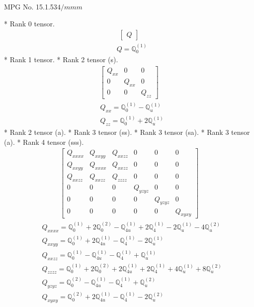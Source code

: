 \documentclass[fleqn,8pt,landscape]{jsarticle}
\begin{document}
\setcounter{MaxMatrixCols}{32}

\renewcommand{\tablename}{Table~}
\renewcommand{\figurename}{Figure~}
\begin{center}
\LARGE
MPG No. 15.1.53\quad$4/mmm$
\end{center}
* Rank 0 tensor.
\begin{align*}
\begin{bmatrix} Q \end{bmatrix}
\end{align*}
\begin{align*}
& Q = \mathbb{Q}_{0}^{(1)}
\end{align*}
* Rank 1 tensor.
* Rank 2 tensor (s).
\begin{align*}
\begin{bmatrix} Q_{xx} & 0 & 0 \\ 0 & Q_{xx} & 0 \\ 0 & 0 & Q_{zz} \end{bmatrix}
\end{align*}
\begin{align*}
& Q_{xx} = \mathbb{Q}_{0}^{(1)} - \mathbb{Q}_{u}^{(1)} \\
& Q_{zz} = \mathbb{Q}_{0}^{(1)} + 2 \mathbb{Q}_{u}^{(1)}
\end{align*}
* Rank 2 tensor (a).
* Rank 3 tensor (ss).
* Rank 3 tensor (sa).
* Rank 3 tensor (a).
* Rank 4 tensor (sss).
\begin{align*}
\begin{bmatrix} Q_{xxxx} & Q_{xxyy} & Q_{xxzz} & 0 & 0 & 0 \\ Q_{xxyy} & Q_{xxxx} & Q_{xxzz} & 0 & 0 & 0 \\ Q_{xxzz} & Q_{xxzz} & Q_{zzzz} & 0 & 0 & 0 \\ 0 & 0 & 0 & Q_{yzyz} & 0 & 0 \\ 0 & 0 & 0 & 0 & Q_{yzyz} & 0 \\ 0 & 0 & 0 & 0 & 0 & Q_{xyxy} \end{bmatrix}
\end{align*}
\begin{align*}
& Q_{xxxx} = \mathbb{Q}_{0}^{(1)} + 2 \mathbb{Q}_{0}^{(2)} - \mathbb{Q}_{4u}^{(1)} + 2 \mathbb{Q}_{4}^{(1)} - 2 \mathbb{Q}_{u}^{(1)} - 4 \mathbb{Q}_{u}^{(2)} \\
& Q_{xxyy} = \mathbb{Q}_{0}^{(1)} + 2 \mathbb{Q}_{4u}^{(1)} - \mathbb{Q}_{4}^{(1)} - 2 \mathbb{Q}_{u}^{(1)} \\
& Q_{xxzz} = \mathbb{Q}_{0}^{(1)} - \mathbb{Q}_{4u}^{(1)} - \mathbb{Q}_{4}^{(1)} + \mathbb{Q}_{u}^{(1)} \\
& Q_{zzzz} = \mathbb{Q}_{0}^{(1)} + 2 \mathbb{Q}_{0}^{(2)} + 2 \mathbb{Q}_{4u}^{(1)} + 2 \mathbb{Q}_{4}^{(1)} + 4 \mathbb{Q}_{u}^{(1)} + 8 \mathbb{Q}_{u}^{(2)} \\
& Q_{yzyz} = \mathbb{Q}_{0}^{(2)} - \mathbb{Q}_{4u}^{(1)} - \mathbb{Q}_{4}^{(1)} + \mathbb{Q}_{u}^{(2)} \\
& Q_{xyxy} = \mathbb{Q}_{0}^{(2)} + 2 \mathbb{Q}_{4u}^{(1)} - \mathbb{Q}_{4}^{(1)} - 2 \mathbb{Q}_{u}^{(2)}
\end{align*}
\end{document}
